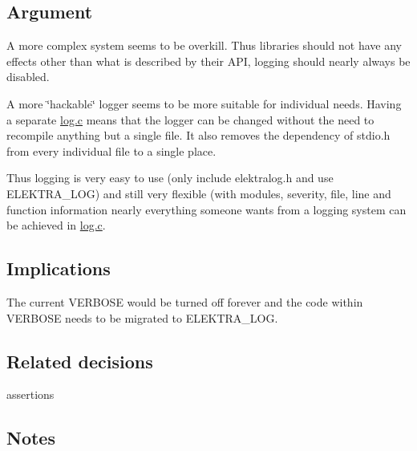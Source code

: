 \subsection*{Argument}

A more complex system seems to be overkill. Thus libraries should not have any effects other than what is described by their A\+P\+I, logging should nearly always be disabled.

A more \char`\"{}hackable\char`\"{} logger seems to be more suitable for individual needs. Having a separate {\ttfamily \hyperlink{log_8c}{log.\+c}} means that the logger can be changed without the need to recompile anything but a single file. It also removes the dependency of {\ttfamily stdio.\+h} from every individual file to a single place.

Thus logging is very easy to use (only include {\ttfamily elektralog.\+h} and use {\ttfamily E\+L\+E\+K\+T\+R\+A\+\_\+\+L\+O\+G}) and still very flexible (with modules, severity, file, line and function information nearly everything someone wants from a logging system can be achieved in {\ttfamily \hyperlink{log_8c}{log.\+c}}.

\subsection*{Implications}

The current V\+E\+R\+B\+O\+S\+E would be turned off forever and the code within V\+E\+R\+B\+O\+S\+E needs to be migrated to {\ttfamily E\+L\+E\+K\+T\+R\+A\+\_\+\+L\+O\+G}.

\subsection*{Related decisions}


\begin{DoxyItemize}
\item assertions
\end{DoxyItemize}

\subsection*{Notes}